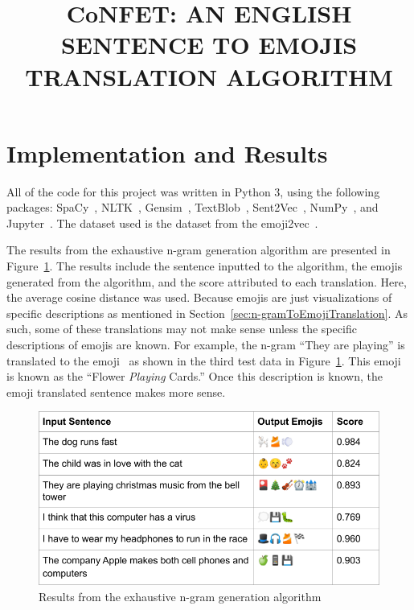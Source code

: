 \documentclass{article}[10]
\newcommand*{\img}[1]{%
  \raisebox{-.3\baselineskip}{%
    \texttt{[image: \#1]}%
  }%
} \title{{CoNFET:} AN ENGLISH SENTENCE TO EMOJIS TRANSLATION ALGORITHM}
\begin{document}
\section{Implementation and Results\label{sec:implementationAndResults}}

All of the code for this project was written in Python 3, using the following
packages: SpaCy~\cite{spacy2}, NLTK~\cite{bird2009natural},
Gensim~\cite{gensim}, TextBlob~\cite{TextBlob}, Sent2Vec~\cite{pg2017unsu},
NumPy~\cite{numpy}, and Jupyter~\cite{Kluyver:2016aa}. The dataset used is the
dataset from the emoji2vec~\cite{Eisner_2016}.

The results from the exhaustive n-gram generation algorithm are presented in
Figure~\ref{fig:extractive}. The results include the sentence inputted to the
algorithm, the emojis generated from the algorithm, and the score attributed to
each translation. Here, the average cosine distance was used. Because emojis are
just visualizations of specific descriptions as mentioned in
Section~\ref{sec:n-gramToEmojiTranslation}. As such, some of these translations
may not make sense unless the specific descriptions of emojis are known. For
example, the n-gram ``They are playing'' is translated to the
emoji~\img{emojis/1f3b4.png} as shown in the third test data in
Figure~\ref{fig:extractive}. This emoji is known as the ``Flower \emph{Playing}
Cards.'' Once this description is known, the emoji translated sentence makes
more sense.

\begin{figure}[H]
  \begin{center}
    \includegraphics[width=\columnwidth]{figures/extractive.png}
    \caption{Results from the exhaustive n-gram generation
      algorithm\label{fig:extractive}}
  \end{center}
\end{figure}
\end{document}
